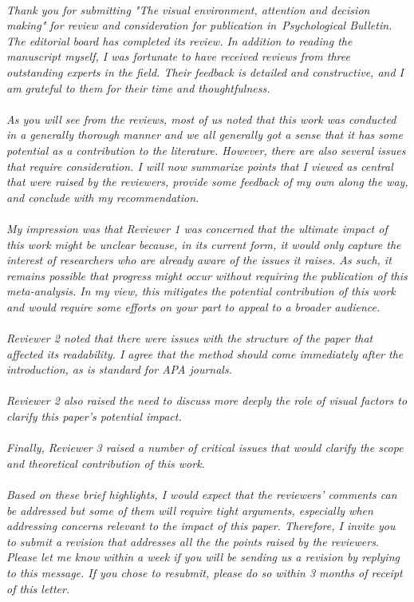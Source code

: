 \documentclass[english,natbib,man,floatsintext]{apa6}
\newcommand\eatpunct[1]{}
\newcommand{\com}[2][]{\vspace{5mm}\paragraph[ ]{ \eatpunct}\label{#1}\emph{#2}\vspace{5mm}}
\begin{document}
\com[com-editor]{Thank you for submitting "The visual environment, attention and decision making" for review and consideration for publication in Psychological Bulletin. The editorial board has completed its review. In addition to reading the manuscript myself, I was fortunate to have received reviews from three outstanding experts in the field. Their feedback is detailed and constructive, and I am grateful to them for their time and thoughtfulness.\\
\\
As you will see from the reviews, most of us noted that this work was conducted in a generally thorough manner and we all generally got a sense that it has some potential as a contribution to the literature. However, there are also several issues that require consideration. I will now summarize points that I viewed as central that were raised by the reviewers, provide some feedback of my own along the way, and conclude with my recommendation.\\
\\
My impression was that Reviewer 1 was concerned that the ultimate impact of this work might be unclear because, in its current form, it would only capture the interest of researchers who are already aware of the issues it raises. As such, it remains possible that progress might occur without requiring the publication of this meta-analysis. In my view, this mitigates the potential contribution of this work and would require some efforts on your part to appeal to a broader audience.\\ 
\\
Reviewer 2 noted that there were issues with the structure of the paper that affected its readability. I agree that the method should come immediately after the introduction, as is standard for APA journals.\\ 
\\
Reviewer 2 also raised the need to discuss more deeply the role of visual factors to clarify this paper’s potential impact.\\ 
\\
Finally, Reviewer 3 raised a number of critical issues that would clarify the scope and theoretical contribution of this work.\\
\\
Based on these brief highlights, I would expect that the reviewers’ comments can be addressed but some of them will require tight arguments, especially when addressing concerns relevant to the impact of this paper. Therefore, I invite you to submit a revision that addresses all the the points raised by the reviewers. Please let me know within a week if you will be sending us a revision by replying to this message. If you chose to resubmit, please do so within 3 months of receipt of this letter.\\
}
\end{document}
